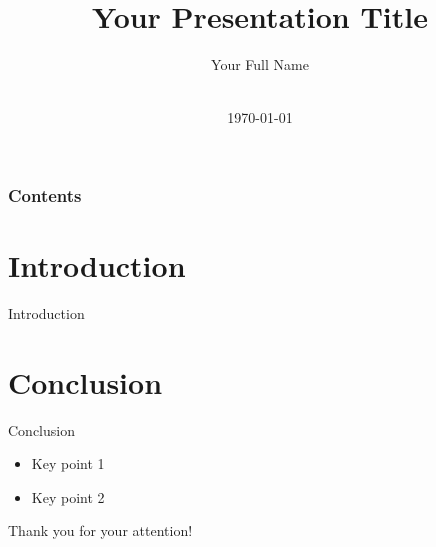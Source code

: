 \documentclass[aspectratio=43]{beamer}
\title[\meetingname]{Your Presentation Title}
\author[Your Name]{Your Full Name}
\institute[Your Institution]{Your Institution Name}
\date[\mydate]{\meetingname\\\today}
\begin{document}
\begin{frame}[plain,t]
\titlepage
\end{frame}

\begin{frame}
\frametitle{Contents}
\tableofcontents
\end{frame}
\section{Introduction}
    \begin{frame}{Introduction}
    \end{frame}


\section{Conclusion}

    \begin{frame}{Conclusion}
    
    \begin{itemize}
        \item Key point 1
        \item Key point 2
    \end{itemize}
    \end{frame}
\begin{frame}[plain,t]
\vspace{100pt}
\centering
Thank you for your attention!
\end{frame}
\end{document}
